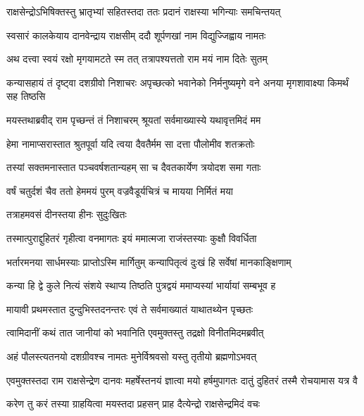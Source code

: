 
\twolineshloka
{राक्षसेन्द्रोऽभिषिक्तस्तु भ्रातृभ्यां सहितस्तदा}
{ततः प्रदानं राक्षस्या भगिन्याः समचिन्तयत्} %

\twolineshloka
{स्वसारं कालकेयाय दानवेन्द्राय राक्षसीम्}
{ददौ शूर्पणखां नाम विद्युज्जिह्वाय नामतः} %

\twolineshloka
{अथ दत्त्वा स्वयं रक्षो मृगयामटते स्म तत्}
{तत्रापश्यत्ततो राम मयं नाम दितेः सुतम्} %

\threelineshloka
{कन्यासहायं तं दृष्ट्वा दशग्रीवो निशाचरः}
{अपृच्छत्को भवानेको निर्मनुष्यमृगे वने}
{अनया मृगशावाक्ष्या किमर्थं सह तिष्ठसि} %

\twolineshloka
{मयस्तथाब्रवीद् राम पृच्छन्तं तं निशाचरम्}
{श्रूयतां सर्वमाख्यास्ये यथावृत्तमिदं मम} %

\twolineshloka
{हेमा नामाप्सरास्तात श्रुतपूर्वा यदि त्वया}
{दैवतैर्मम सा दत्ता पौलोमीव शतक्रतोः} %

\twolineshloka
{तस्यां सक्तमनास्तात पञ्चवर्षशतान्यहम्}
{सा च दैवतकार्येण त्रयोदश समा गताः} %

\twolineshloka
{वर्षं चतुर्दशं चैव ततो हेममयं पुरम्}
{वज्रवैडूर्यचित्रं च मायया निर्मितं मया} %

\onelineshloka
{तत्राहमवसं दीनस्तया हीनः सुदुःखितः} %

\twolineshloka
{तस्मात्पुराद्दुहितरं गृहीत्वा वनमागतः}
{इयं ममात्मजा राजंस्तस्याः कुक्षौ विवर्धिता} %

\twolineshloka
{भर्तारमनया सार्धमस्याः प्राप्तोऽस्मि मार्गितुम्}
{कन्यापितृत्वं दुःखं हि सर्वेषां मानकाङ्क्षिणाम्} %

\twolineshloka
{कन्या हि द्वे कुले नित्यं संशये स्थाप्य तिष्ठति}
{पुत्रद्वयं ममाप्यस्यां भार्यायां सम्बभूव ह} %

\twolineshloka
{मायावी प्रथमस्तात दुन्दुभिस्तदनन्तरः}
{एवं ते सर्वमाख्यातं याथातथ्येन पृच्छतः} %

\twolineshloka
{त्वामिदानीं कथं तात जानीयां को भवानिति}
{एवमुक्तस्तु तद्रक्षो विनीतमिदमब्रवीत्} %

\twolineshloka
{अहं पौलस्त्यतनयो दशग्रीवश्च नामतः}
{मुनेर्विश्रवसो यस्तु तृतीयो ब्रह्मणोऽभवत्} %

\threelineshloka
{एवमुक्तस्तदा राम राक्षसेन्द्रेण दानवः}
{महर्षेस्तनयं ज्ञात्वा मयो हर्षमुपागतः}
{दातुं दुहितरं तस्मै रोचयामास यत्र वै} %

\twolineshloka
{करेण तु करं तस्या ग्राहयित्वा मयस्तदा}
{प्रहसन् प्राह दैत्येन्द्रो राक्षसेन्द्रमिदं वचः} %

